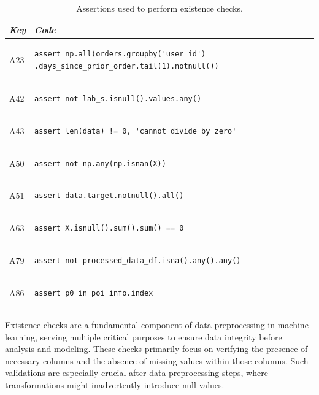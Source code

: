 \begin{table}
\centering
\begin{tabular}{@{}m{} m{}@{}}
\toprule
\emph{\textbf{Key}}&
\emph{\textbf{Code}}\\
\midrule

A23 &
\begin{lstlisting}
assert np.all(orders.groupby('user_id') .days_since_prior_order.tail(1).notnull())
\end{lstlisting}\\

A42 &
\begin{lstlisting}
assert not lab_s.isnull().values.any()
\end{lstlisting}\\

A43 &
\begin{lstlisting}
assert len(data) != 0, 'cannot divide by zero'
\end{lstlisting}\\

A50 &
\begin{lstlisting}
assert not np.any(np.isnan(X))
\end{lstlisting}\\

A51 &
\begin{lstlisting}
assert data.target.notnull().all()
\end{lstlisting}\\

A63 &
\begin{lstlisting}
assert X.isnull().sum().sum() == 0
\end{lstlisting}\\

A79 &
\begin{lstlisting}
assert not processed_data_df.isna().any().any()
\end{lstlisting}\\

A86 &
\begin{lstlisting}
assert p0 in poi_info.index
\end{lstlisting}\\
\end{tabular}
\caption{Assertions used to perform existence checks.}
\label{tab:existence-check}
\end{table}

Existence checks are a fundamental component of data preprocessing in machine learning, serving multiple critical purposes to ensure data integrity before analysis and modeling. These checks primarily focus on verifying the presence of necessary columns and the absence of missing values within those columns. Such validations are especially crucial after data preprocessing steps, where transformations might inadvertently introduce null values.

